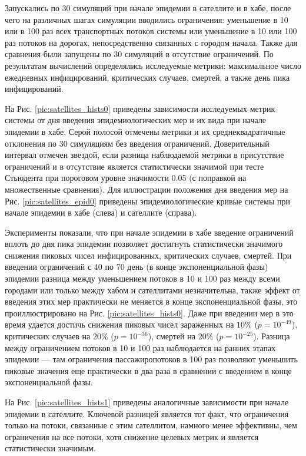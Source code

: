 \documentclass[a4paper,12pt]{article} %
\begin{document}
Запускались по 30 симуляций при начале эпидемии в сателлите и в хабе, после чего на различных шагах симуляции вводились ограничения: уменьшение в 10 или в 100 раз всех транспортных потоков системы или уменьшение в 10 или 100 раз потоков на дорогах, непосредственно связанных с городом начала. Также для сравнения были запущены по 30 симуляций в отсутствие ограничений. По результатам вычислений определялись исследуемые метрики: максимальное число ежедневных инфицирований, критических случаев, смертей, а также день пика инфицирований.

На Рис. \ref{pic:satellites_hists0} приведены зависимости исследуемых метрик системы от дня введения эпидемиологических мер и их вида при начале эпидемии в хабе. Серой полосой отмечены метрики и их среднеквадратичные отклонения по 30 симуляциям без введения ограничений. Доверительный интервал отмечен звездой, если разница наблюдаемой метрики в присутствие ограничений и в отсутствие является статистически значимой при тесте Стьюдента при пороговом уровне значимости 0.05 (с поправкой на множественные сравнения). Для иллюстрации положения дня введения мер на Рис. \ref{pic:satellites_epid0} приведены эпидемиологические кривые системы при начале эпидемии в хабе (слева) и сателлите (справа).

Эксперименты показали, что при начале эпидемии в хабе введение ограничений вплоть до дня пика эпидемии позволяет достигнуть статистически значимого снижения пиковых чисел инфицированных, критических случаев, смертей. При введении ограничений с 40 по 70 день (в конце экспоненциальной фазы) эпидемии разница между уменьшением потоков в 10 и 100 раз между всеми городами или только между хабом и сателлитами незначительна, также эффект от введения этих мер практически не меняется в конце экспоненциальной фазы, это проиллюстрировано на Рис. \ref{pic:satellites_hists0}. Даже при введении мер в это время удается достичь снижения пиковых чисел зараженных на $10\%$ ($p = 10^{-49}$), критических случаев на $20\%$ ($p = 10^{-36}$), смертей на $20\%$ ($p = 10^{-25}$). Разница между ограничением потоков в 10 и 100 раз наблюдается на ранних этапах эпидемии --- там ограничения пассажиропотоков в 100 раз позволяют уменьшить пиковые значения еще практически в два раза в сравнении с введением в конце экспоненциальной фазы.

На Рис. \ref{pic:satellites_hists1} приведены аналогичные зависимости при начале эпидемии в сателлите. Ключевой разницей является тот факт, что ограничения только на потоки, связанные с этим сателлитом, намного менее эффективны, чем ограничения на все потоки, хотя снижение целевых метрик и является статистически значимым.
\end{document}
